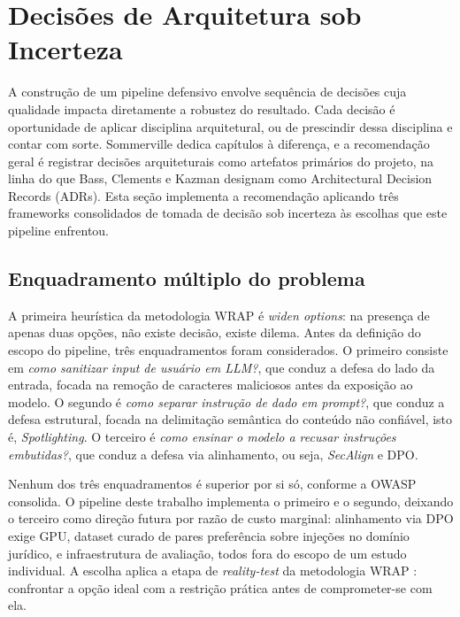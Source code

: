 \documentclass[11pt,a4paper]{article}
\begin{document}
\section{Decisões de Arquitetura sob Incerteza}

A construção de um pipeline defensivo envolve sequência de decisões cuja qualidade impacta diretamente a robustez do resultado. Cada decisão é oportunidade de aplicar disciplina arquitetural, ou de prescindir dessa disciplina e contar com sorte. Sommerville \cite{sommerville2016} dedica capítulos à diferença, e a recomendação geral é registrar decisões arquiteturais como artefatos primários do projeto, na linha do que Bass, Clements e Kazman \cite{bass2012} designam como Architectural Decision Records (ADRs). Esta seção implementa a recomendação aplicando três frameworks consolidados de tomada de decisão sob incerteza às escolhas que este pipeline enfrentou.

\subsection{Enquadramento múltiplo do problema}

A primeira heurística da metodologia WRAP \cite{heath2013} é \emph{widen options}: na presença de apenas duas opções, não existe decisão, existe dilema. Antes da definição do escopo do pipeline, três enquadramentos foram considerados. O primeiro consiste em \emph{como sanitizar input de usuário em LLM?}, que conduz a defesa do lado da entrada, focada na remoção de caracteres maliciosos antes da exposição ao modelo. O segundo é \emph{como separar instrução de dado em prompt?}, que conduz a defesa estrutural, focada na delimitação semântica do conteúdo não confiável, isto é, \emph{Spotlighting}. O terceiro é \emph{como ensinar o modelo a recusar instruções embutidas?}, que conduz a defesa via alinhamento, ou seja, \emph{SecAlign} e DPO.

Nenhum dos três enquadramentos é superior por si só, conforme a OWASP \cite{owasp2025} consolida. O pipeline deste trabalho implementa o primeiro e o segundo, deixando o terceiro como direção futura por razão de custo marginal: alinhamento via DPO exige GPU, dataset curado de pares preferência sobre injeções no domínio jurídico, e infraestrutura de avaliação, todos fora do escopo de um estudo individual. A escolha aplica a etapa de \emph{reality-test} da metodologia WRAP \cite{heath2013}: confrontar a opção ideal com a restrição prática antes de comprometer-se com ela.
\end{document}

